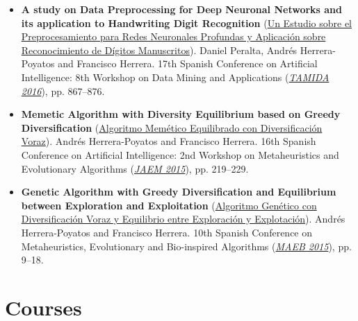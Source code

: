 \documentclass[10pt,a4paper,sans]{moderncv} %
\begin{document}
	\begin{itemize}
		\item \textbf{A study on Data Preprocessing for Deep Neuronal Networks and its application to Handwriting Digit Recognition} (\textcolor{colorl}{\href{https://www.researchgate.net/publication/308901913_Un_Estudio_sobre_el_Preprocesamiento_para_Redes_Neuronales_Profundas_y_Aplicacion_sobre_Reconocimiento_de_Digitos_Manuscritos}{Un Estudio sobre el Preprocesamiento para Redes Neuronales Profundas y Aplicación sobre Reconocimiento de Dígitos Manuscritos}}). Daniel Peralta, Andrés Herrera-Poyatos and Francisco Herrera. 17th Spanish Conference on Artificial Intelligence: 8th Workshop on Data Mining and Applications (\textcolor{colorl}{\textit{\href{http://www.congresocedi.es/en/tamida}{TAMIDA 2016}}}), pp. 867--876.
		\item \textbf{Memetic Algorithm with Diversity Equilibrium based on Greedy Diversification} (\textcolor{colorl}{\href{https://www.researchgate.net/publication/320701097_Algoritmo_Memetico_Equilibrado_con_Diversificacion_Voraz}{Algoritmo Memético Equilibrado con Diversificación Voraz}}). Andrés Herrera-Poyatos and Francisco Herrera. 16th Spanish Conference on Artificial Intelligence: 2nd Workshop on Metaheuristics and Evolutionary Algorithms (\textcolor{colorl}{\textit{\href{http://simd.albacete.org/caepia15/en/conference/jaem15/}{JAEM 2015}}}), pp. 219--229.
		\item  \textbf{Genetic Algorithm with Greedy Diversification and Equilibrium between Exploration and Exploitation} (\textcolor{colorl}{\href{https://www.researchgate.net/publication/320701127_Algoritmo_Genetico_con_Diversificacion_Voraz_y_Equilibrio_entre_Exploracion_y_Explotacion}{Algoritmo Genético con Diversificación Voraz y Equilibrio entre Exploración y Explotación}}). Andrés Herrera-Poyatos and Francisco Herrera. 10th Spanish Conference on Metaheuristics, Evolutionary and Bio-inspired Algorithms (\textcolor{colorl}{\textit{\href{http://www.eweb.unex.es/eweb/maeb2015/}{MAEB 2015}}}), pp. 9--18.
	\end{itemize}



\vspace*{-2mm}
\section{Courses}
\end{document}
